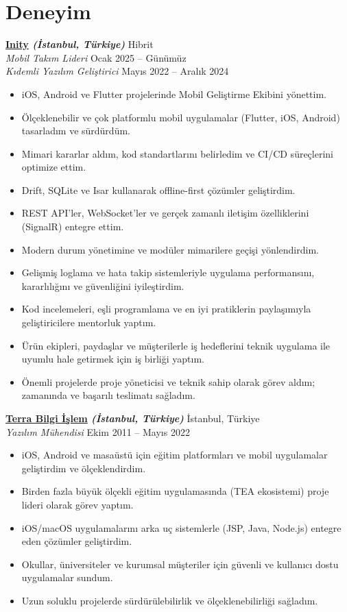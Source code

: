 \documentclass[11pt,a4paper]{extarticle}
\begin{document}
\section{Deneyim}
\textbf{\href{https://inity.com.tr}{Inity} \textit{(İstanbul, Türkiye)}} \hfill Hibrit\\
\textit{Mobil Takım Lideri} \hfill Ocak 2025 -- Günümüz\\
\textit{Kıdemli Yazılım Geliştirici} \hfill Mayıs 2022 -- Aralık 2024
\begin{itemize}[leftmargin=*,noitemsep,topsep=0pt]
    \item iOS, Android ve Flutter projelerinde Mobil Geliştirme Ekibini yönettim.
    \item Ölçeklenebilir ve çok platformlu mobil uygulamalar (Flutter, iOS, Android) tasarladım ve sürdürdüm.
    \item Mimari kararlar aldım, kod standartlarını belirledim ve CI/CD süreçlerini optimize ettim.
    \item Drift, SQLite ve Isar kullanarak offline-first çözümler geliştirdim.
    \item REST API’ler, WebSocket’ler ve gerçek zamanlı iletişim özelliklerini (SignalR) entegre ettim.
    \item Modern durum yönetimine ve modüler mimarilere geçişi yönlendirdim.
    \item Gelişmiş loglama ve hata takip sistemleriyle uygulama performansını, kararlılığını ve güvenliğini iyileştirdim.
    \item Kod incelemeleri, eşli programlama ve en iyi pratiklerin paylaşımıyla geliştiricilere mentorluk yaptım.
    \item Ürün ekipleri, paydaşlar ve müşterilerle iş hedeflerini teknik uygulama ile uyumlu hale getirmek için iş birliği yaptım.
    \item Önemli projelerde proje yöneticisi ve teknik sahip olarak görev aldım; zamanında ve başarılı teslimatı sağladım.
\end{itemize}

\textbf{\href{https://www.terrabilgiisilem}{Terra Bilgi İşlem} \textit{(İstanbul, Türkiye)}} \hfill İstanbul, Türkiye\\
\textit{Yazılım Mühendisi} \hfill Ekim 2011 -- Mayıs 2022
\begin{itemize}[leftmargin=*,noitemsep,topsep=0pt]
    \item iOS, Android ve masaüstü için eğitim platformları ve mobil uygulamalar geliştirdim ve ölçeklendirdim.
    \item Birden fazla büyük ölçekli eğitim uygulamasında (TEA ekosistemi) proje lideri olarak görev yaptım.
    \item iOS/macOS uygulamalarını arka uç sistemlerle (JSP, Java, Node.js) entegre eden çözümler geliştirdim.
    \item Okullar, üniversiteler ve kurumsal müşteriler için güvenli ve kullanıcı dostu uygulamalar sundum.
    \item Uzun soluklu projelerde sürdürülebilirlik ve ölçeklenebilirliği sağladım.
\end{itemize}
\end{document}

